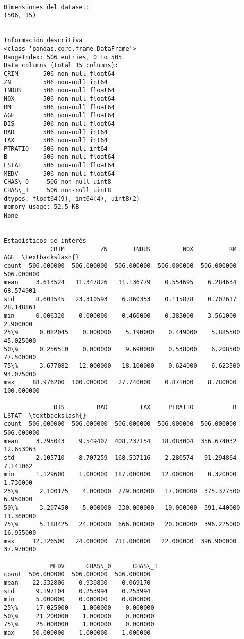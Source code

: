 \documentclass[11pt]{article}
\begin{document}
    \begin{Verbatim}[commandchars=\\\{\}]

Dimensiones del dataset:
(506, 15)


Información descritiva
<class 'pandas.core.frame.DataFrame'>
RangeIndex: 506 entries, 0 to 505
Data columns (total 15 columns):
CRIM       506 non-null float64
ZN         506 non-null int64
INDUS      506 non-null float64
NOX        506 non-null float64
RM         506 non-null float64
AGE        506 non-null float64
DIS        506 non-null float64
RAD        506 non-null int64
TAX        506 non-null int64
PTRATIO    506 non-null int64
B          506 non-null float64
LSTAT      506 non-null float64
MEDV       506 non-null float64
CHAS\_0     506 non-null uint8
CHAS\_1     506 non-null uint8
dtypes: float64(9), int64(4), uint8(2)
memory usage: 52.5 KB
None


Estadísticos de interés
             CRIM          ZN       INDUS         NOX          RM         AGE  \textbackslash{}
count  506.000000  506.000000  506.000000  506.000000  506.000000  506.000000   
mean     3.613524   11.347826   11.136779    0.554695    6.284634   68.574901   
std      8.601545   23.310593    6.860353    0.115878    0.702617   28.148861   
min      0.006320    0.000000    0.460000    0.385000    3.561000    2.900000   
25\%      0.082045    0.000000    5.190000    0.449000    5.885500   45.025000   
50\%      0.256510    0.000000    9.690000    0.538000    6.208500   77.500000   
75\%      3.677082   12.000000   18.100000    0.624000    6.623500   94.075000   
max     88.976200  100.000000   27.740000    0.871000    8.780000  100.000000   

              DIS         RAD         TAX     PTRATIO           B       LSTAT  \textbackslash{}
count  506.000000  506.000000  506.000000  506.000000  506.000000  506.000000   
mean     3.795043    9.549407  408.237154   18.083004  356.674032   12.653063   
std      2.105710    8.707259  168.537116    2.280574   91.294864    7.141062   
min      1.129600    1.000000  187.000000   12.000000    0.320000    1.730000   
25\%      2.100175    4.000000  279.000000   17.000000  375.377500    6.950000   
50\%      3.207450    5.000000  330.000000   19.000000  391.440000   11.360000   
75\%      5.188425   24.000000  666.000000   20.000000  396.225000   16.955000   
max     12.126500   24.000000  711.000000   22.000000  396.900000   37.970000   

             MEDV      CHAS\_0      CHAS\_1  
count  506.000000  506.000000  506.000000  
mean    22.532806    0.930830    0.069170  
std      9.197104    0.253994    0.253994  
min      5.000000    0.000000    0.000000  
25\%     17.025000    1.000000    0.000000  
50\%     21.200000    1.000000    0.000000  
75\%     25.000000    1.000000    0.000000  
max     50.000000    1.000000    1.000000  

    \end{Verbatim}
\end{document}

